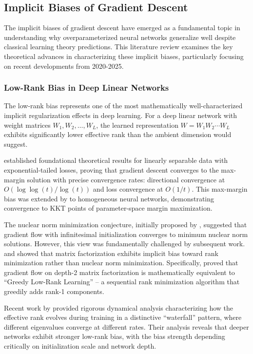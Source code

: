\documentclass[11pt]{article}
\begin{document}
\subsection*{Implicit Biases of Gradient Descent}
The implicit biases of gradient descent have emerged as a fundamental topic in understanding why overparameterized neural networks generalize well despite classical learning theory predictions. This literature review examines the key theoretical advances in characterizing these implicit biases, particularly focusing on recent developments from 2020-2025.
\subsubsection{Low-Rank Bias in Deep Linear Networks}

The low-rank bias represents one of the most mathematically well-characterized implicit regularization effects in deep learning. For a deep linear network with weight matrices $W_1, W_2, \ldots, W_L$, the learned representation $W = W_1 W_2 \cdots W_L$ exhibits significantly lower effective rank than the ambient dimension would suggest.

\citet{soudry2018implicit} established foundational theoretical results for linearly separable data with exponential-tailed losses, proving that gradient descent converges to the max-margin solution with precise convergence rates: directional convergence at $O(\log \log(t)/\log(t))$ and loss convergence at $O(1/t)$. This max-margin bias was extended by \citet{lyu2019gradient} to homogeneous neural networks, demonstrating convergence to KKT points of parameter-space margin maximization.

The nuclear norm minimization conjecture, initially proposed by \citet{gunasekar2017implicit}, suggested that gradient flow with infinitesimal initialization converges to minimum nuclear norm solutions. However, this view was fundamentally challenged by subsequent work. \citet{arora2019implicit} and \citet{li2020towards} showed that matrix factorization exhibits implicit bias toward rank minimization rather than nuclear norm minimization. Specifically, \citet{li2020towards} proved that gradient flow on depth-2 matrix factorization is mathematically equivalent to ``Greedy Low-Rank Learning'' -- a sequential rank minimization algorithm that greedily adds rank-1 components.

Recent work by \citet{chou2024gradient} provided rigorous dynamical analysis characterizing how the effective rank evolves during training in a distinctive ``waterfall'' pattern, where different eigenvalues converge at different rates. Their analysis reveals that deeper networks exhibit stronger low-rank bias, with the bias strength depending critically on initialization scale and network depth.
\end{document}
